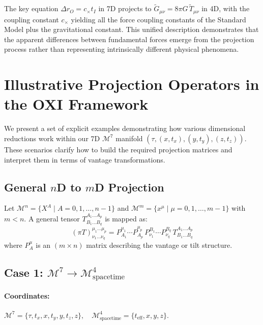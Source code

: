 \documentclass{article}
\newcommand{\tl}[1]{\tilde{#1}}
\begin{document}
The key equation $\Delta r_O = c_{\times} t_I$ in 7D projects to $\tl{G}_{\mu\nu} = 8\pi G \, \tl{T}_{\mu\nu}$ in 4D, with the coupling constant $c_{\times}$ yielding all the force coupling constants of the Standard Model plus the gravitational constant. This unified description demonstrates that the apparent differences between fundamental forces emerge from the projection process rather than representing intrinsically different physical phenomena.




\section{Illustrative Projection Operators in the OXI Framework}
\label{sec:ProjectionOperators}

We present a set of explicit examples demonstrating how various dimensional reductions work within our 7D $\mathcal{M}^7$ manifold $(\tau, (x, t_x), (y, t_y), (z, t_z))$. These scenarios clarify how to build the required projection matrices and interpret them in terms of vantage transformations.

\subsection{General $n$D to $m$D Projection}

Let $\mathcal{M}^n = \{ X^A \mid A=0,1,\ldots,n-1 \}$ and $\mathcal{M}^m = \{ x^\mu \mid \mu=0,1,\ldots,m-1 \}$ with $m < n$. A general tensor $T^{A_1 \ldots A_p}_{B_1 \ldots B_q}$ is mapped as:
\begin{equation}
(\pi T)^{\mu_1\ldots\mu_p}_{\nu_1\ldots\nu_q} = P^{\mu_1}_{A_1}\cdots P^{\mu_p}_{A_p}\, P^{B_1}_{\nu_1}\cdots P^{B_q}_{\nu_q}\, T^{A_1\ldots A_p}_{B_1\ldots B_q}
\end{equation}
where $P^{\mu}_{A}$ is an $(m\times n)$ matrix describing the vantage or tilt structure.

\subsection{Case 1: $\mathcal{M}^7 \to \mathcal{M}^4_{\text{spacetime}}$}
\label{sec:CaseSpacetime}

\paragraph{Coordinates:} \(
\mathcal{M}^7=\{\tau, t_x, x, t_y, y, t_z, z\},\quad \mathcal{M}^4_{\text{spacetime}}=\{t_{\text{eff}}, x, y, z\}.
\)
\end{document}
